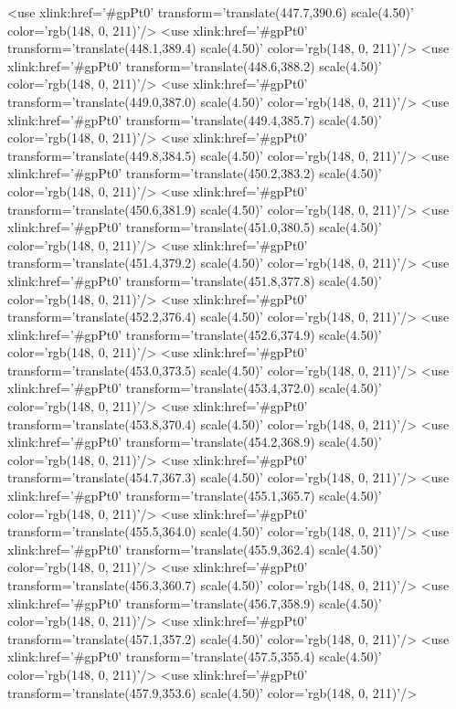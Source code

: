	<use xlink:href='#gpPt0' transform='translate(447.7,390.6) scale(4.50)' color='rgb(148,   0, 211)'/>
	<use xlink:href='#gpPt0' transform='translate(448.1,389.4) scale(4.50)' color='rgb(148,   0, 211)'/>
	<use xlink:href='#gpPt0' transform='translate(448.6,388.2) scale(4.50)' color='rgb(148,   0, 211)'/>
	<use xlink:href='#gpPt0' transform='translate(449.0,387.0) scale(4.50)' color='rgb(148,   0, 211)'/>
	<use xlink:href='#gpPt0' transform='translate(449.4,385.7) scale(4.50)' color='rgb(148,   0, 211)'/>
	<use xlink:href='#gpPt0' transform='translate(449.8,384.5) scale(4.50)' color='rgb(148,   0, 211)'/>
	<use xlink:href='#gpPt0' transform='translate(450.2,383.2) scale(4.50)' color='rgb(148,   0, 211)'/>
	<use xlink:href='#gpPt0' transform='translate(450.6,381.9) scale(4.50)' color='rgb(148,   0, 211)'/>
	<use xlink:href='#gpPt0' transform='translate(451.0,380.5) scale(4.50)' color='rgb(148,   0, 211)'/>
	<use xlink:href='#gpPt0' transform='translate(451.4,379.2) scale(4.50)' color='rgb(148,   0, 211)'/>
	<use xlink:href='#gpPt0' transform='translate(451.8,377.8) scale(4.50)' color='rgb(148,   0, 211)'/>
	<use xlink:href='#gpPt0' transform='translate(452.2,376.4) scale(4.50)' color='rgb(148,   0, 211)'/>
	<use xlink:href='#gpPt0' transform='translate(452.6,374.9) scale(4.50)' color='rgb(148,   0, 211)'/>
	<use xlink:href='#gpPt0' transform='translate(453.0,373.5) scale(4.50)' color='rgb(148,   0, 211)'/>
	<use xlink:href='#gpPt0' transform='translate(453.4,372.0) scale(4.50)' color='rgb(148,   0, 211)'/>
	<use xlink:href='#gpPt0' transform='translate(453.8,370.4) scale(4.50)' color='rgb(148,   0, 211)'/>
	<use xlink:href='#gpPt0' transform='translate(454.2,368.9) scale(4.50)' color='rgb(148,   0, 211)'/>
	<use xlink:href='#gpPt0' transform='translate(454.7,367.3) scale(4.50)' color='rgb(148,   0, 211)'/>
	<use xlink:href='#gpPt0' transform='translate(455.1,365.7) scale(4.50)' color='rgb(148,   0, 211)'/>
	<use xlink:href='#gpPt0' transform='translate(455.5,364.0) scale(4.50)' color='rgb(148,   0, 211)'/>
	<use xlink:href='#gpPt0' transform='translate(455.9,362.4) scale(4.50)' color='rgb(148,   0, 211)'/>
	<use xlink:href='#gpPt0' transform='translate(456.3,360.7) scale(4.50)' color='rgb(148,   0, 211)'/>
	<use xlink:href='#gpPt0' transform='translate(456.7,358.9) scale(4.50)' color='rgb(148,   0, 211)'/>
	<use xlink:href='#gpPt0' transform='translate(457.1,357.2) scale(4.50)' color='rgb(148,   0, 211)'/>
	<use xlink:href='#gpPt0' transform='translate(457.5,355.4) scale(4.50)' color='rgb(148,   0, 211)'/>
	<use xlink:href='#gpPt0' transform='translate(457.9,353.6) scale(4.50)' color='rgb(148,   0, 211)'/>
